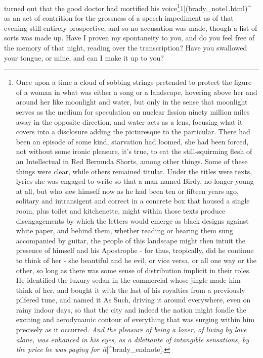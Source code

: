 \documentclass[
]{memoir}
\begin{document}
turned out that the good doctor had mortified his voice\footnote{Once
  upon a time a cloud of sobbing strings pretended to protect the figure
  of a woman in what was either a song or a landscape, hovering above
  her and around her like moonlight and water, but only in the sense
  that moonlight serves as the medium for speculation on nuclear fission
  ninety million miles away in the opposite direction, and water acts as
  a lens, focusing what it covers into a disclosure adding the
  picturesque to the particular. There had been an episode of some kind,
  starvation had loomed, she had been forced, not without some ironic
  pleasure, it's true, to eat the still-squirming flesh of an
  Intellectual in Red Bermuda Shorts, among other things. Some of these
  things were clear, while others remained titular. Under the titles
  were texts, lyrics she was engaged to write so that a man named Birdy,
  no longer young at all, but who saw himself now as he had been ten or
  fifteen years ago, solitary and intransigent and correct in a concrete
  box that housed a single room, plus toilet and kitchenette, might
  within those texts produce disengagements by which the letters would
  emerge as black designs against white paper, and behind them, whether
  reading or hearing them sung accompanied by guitar, the people of this
  landscape might then intuit the presence of himself and his Apostrophe
  - for thus, tropically, did he continue to think of her - she
  beautiful and he evil, or vice versa, or all one way or the other, so
  long as there was some sense of distribution implicit in their roles.
  He identified the luxury sedan in the commercial whose jingle made him
  think of her, and bought it with the last of his royalties from a
  previously pilfered tune, and named it As Such, driving it around
  everywhere, even on rainy indoor days, so that the city and indeed the
  nation might fondle the exciting and aerodynamic contour of everything
  that was surging within him precisely as it occurred. \emph{And the
  pleasure of being a lover, of living by love alone, was enhanced in
  his eyes, as a dilettante of intangible sensations, by the price he
  was paying for it}{[}\^{}brady\_endnote{]}.}1{]}(brady\_note1.html)\^{}
as an act of contrition for the grossness of a speech impediment as of
that evening still entirely prospective, and so no accusation was made,
though a list of sorts was made up. Have I proven my spontaneity to you,
and do you feel free of the memory of that night, reading over the
transcription? Have you swallowed your tongue, or mine, and can I make
it up to you?
\end{document}
